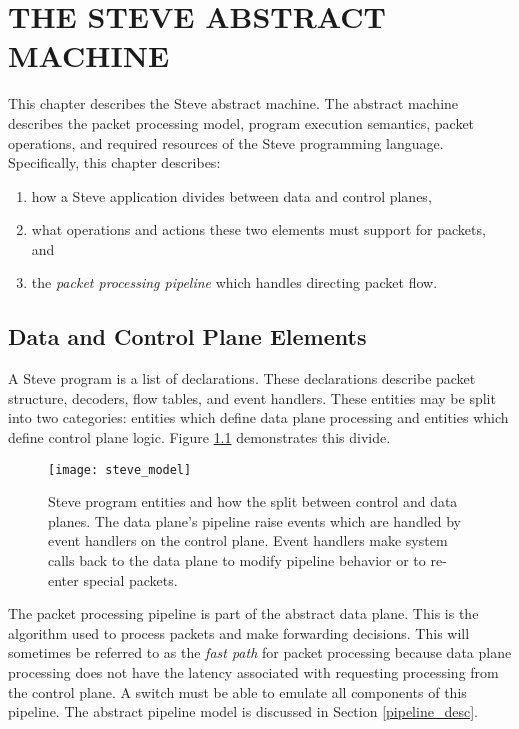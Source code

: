 \chapter{THE STEVE ABSTRACT MACHINE} \label{ch:pipeline_model}

This chapter describes the Steve abstract machine. The abstract machine
describes the packet processing model, program execution semantics, packet operations, and required resources of the Steve programming language.
Specifically, this chapter describes:

\begin{enumerate}
\item how a Steve application divides between data and control planes,
\item what operations and actions these two elements must support for packets, and
\item the \emph{packet processing pipeline} which handles directing packet flow.
\end{enumerate}
%

\section{Data and Control Plane Elements}

A Steve program is a list of declarations. These declarations describe
packet structure, decoders, flow tables, and event handlers.
These entities may be split into two categories:
entities which define data plane processing and
entities which define control plane logic. 
Figure \ref{fg:abstract_switch} demonstrates this divide.

\begin{figure}[ht]
\texttt{[image: steve\_model]}
\caption{Steve program entities and how the split between control and
data planes. The data plane's pipeline raise events which are handled by event 
handlers on the control plane. Event handlers make system calls back to the
data plane to modify pipeline behavior or to re-enter special packets.}
\label{fg:abstract_switch} 
\end{figure}

The packet processing pipeline is part of the abstract data plane.
This is the algorithm used to process packets and
make forwarding decisions.
This will sometimes be referred to as the \emph{fast path} for packet
processing because
data plane processing does not have the latency associated
with requesting processing from the control plane. 
A switch must be able to emulate all components of this pipeline.
The abstract pipeline model is discussed in Section \ref{pipeline_desc}.

